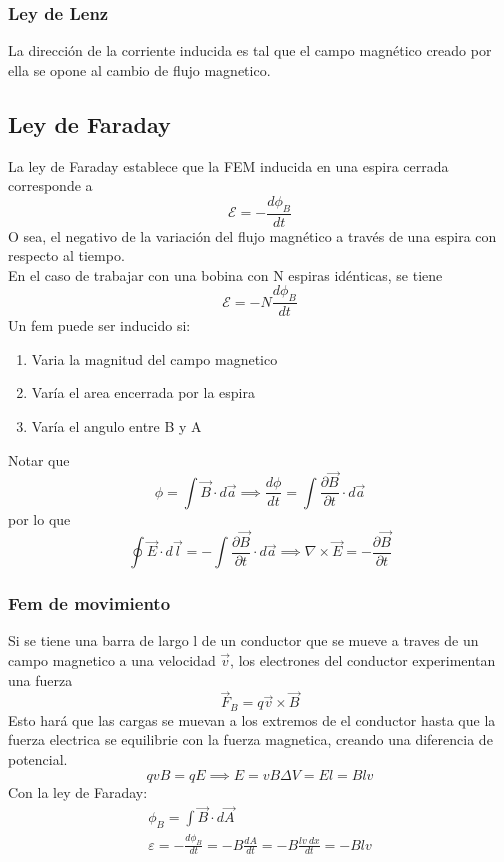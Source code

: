 \documentclass[a4paper, 10pt]{article}
\begin{document}
\begin{multicols*}{2}
  \subsubsection{Ley de Lenz}
  La dirección de la corriente inducida es tal que
  el campo magnético creado por ella se opone al cambio de flujo
  magnetico.

  \subsection{Ley de Faraday}
	La ley de Faraday establece que la FEM inducida en una espira cerrada corresponde a
	$$\mathcal{E} = -\frac{d \phi_{B}}{dt}$$
	O sea, el negativo de la variación del flujo magnético a través de una espira con respecto al tiempo.\\
	En el caso de trabajar con una bobina con N espiras idénticas, se tiene
	$$\mathcal{E} = -N \frac{d \phi_{B}}{dt}$$
  Un fem puede ser inducido si:
  \begin{enumerate}
    \item Varia la magnitud del campo magnetico
    \item Varía el area encerrada por la espira
    \item Varía el angulo entre B y A
  \end{enumerate}
  Notar que
  \begin{equation}
    \phi = \int \vec{B} \cdot d\vec{a} \implies \frac{d \phi}{dt} 
    = \int \frac{\partial \vec{B}}{\partial t} \cdot d \vec{a}
  \end{equation}
  por lo que
  \begin{equation}
    \oint \vec{E} \cdot d\vec{l} = -\int \frac{\partial \vec{B}}{\partial t} \cdot d \vec{a}
    \implies \nabla \times \vec{E} = - \frac{\partial \vec{B}}{\partial t}
  \end{equation}

  \subsubsection{Fem de movimiento}
  Si se tiene una barra de largo l de un conductor que se 
  mueve a traves de un campo magnetico a una velocidad $\vec{v}$,
  los electrones del conductor experimentan una fuerza
  \begin{equation}
    \vec{F}_B = q \vec{v} \times \vec{B}
  \end{equation}
  Esto hará que las cargas se muevan a los extremos de el conductor
  hasta que la fuerza electrica se equilibrie con la fuerza magnetica,
  creando una diferencia de potencial.
  \begin{equation}
    qvB = qE \implies E = vB \Delta V = E l = B l v
  \end{equation}
  Con la ley de Faraday:
  \begin{gather}
    \phi_B = \int \vec{B} \cdot d \vec{A}\\
    \varepsilon = - \frac{d \phi_B}{dt} = -B \frac{dA}{dt} = - B \frac{lv\ dx}{dt} = - Blv
  \end{gather}


\end{multicols*}
\end{document}
